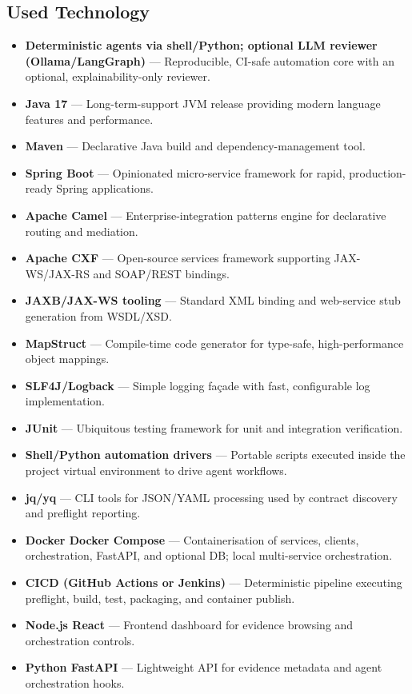 \documentclass[11pt,a4paper]{article}
\begin{document}
\subsection{Used Technology}
\begin{itemize}
  \item \textbf{Deterministic agents via shell/Python; optional LLM reviewer (Ollama/LangGraph)} — Reproducible, CI-safe automation core with an optional, explainability-only reviewer.
  \item \textbf{Java 17} — Long-term-support JVM release providing modern language features and performance.
  \item \textbf{Maven} — Declarative Java build and dependency-management tool.
  \item \textbf{Spring Boot} — Opinionated micro-service framework for rapid, production-ready Spring applications.
  \item \textbf{Apache Camel} — Enterprise-integration patterns engine for declarative routing and mediation.
  \item \textbf{Apache CXF} — Open-source services framework supporting JAX-WS/JAX-RS and SOAP/REST bindings.
  \item \textbf{JAXB/JAX-WS tooling} — Standard XML binding and web-service stub generation from WSDL/XSD.
  \item \textbf{MapStruct} — Compile-time code generator for type-safe, high-performance object mappings.
  \item \textbf{SLF4J/Logback} — Simple logging façade with fast, configurable log implementation.
  \item \textbf{JUnit} — Ubiquitous testing framework for unit and integration verification.
  \item \textbf{Shell/Python automation drivers} — Portable scripts executed inside the project virtual environment to drive agent workflows.
  \item \textbf{jq/yq} — CLI tools for JSON/YAML processing used by contract discovery and preflight reporting.
  \item \textbf{Docker \/ Docker Compose} — Containerisation of services, clients, orchestration, FastAPI, and optional DB; local multi-service orchestration.
  \item \textbf{CI\/CD (GitHub Actions or Jenkins)} — Deterministic pipeline executing preflight, build, test, packaging, and container publish.
  \item \textbf{Node.js \/ React} — Frontend dashboard for evidence browsing and orchestration controls.
  \item \textbf{Python \/ FastAPI} — Lightweight API for evidence metadata and agent orchestration hooks.
\end{itemize}
\end{document}
